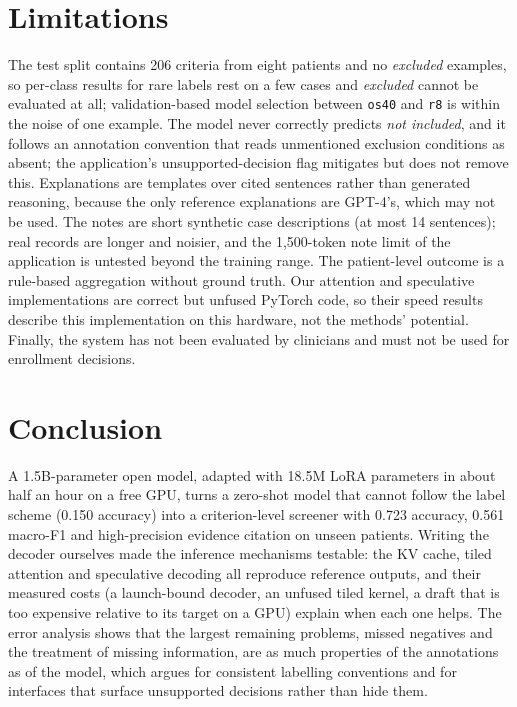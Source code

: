 \documentclass[conference]{IEEEtran}
\begin{document}
\section{Limitations}
The test split contains 206 criteria from eight patients and no \emph{excluded} examples, so per-class results for rare labels rest on a few cases and \emph{excluded} cannot be evaluated at all; validation-based model selection between \texttt{os40} and \texttt{r8} is within the noise of one example. The model never correctly predicts \emph{not included}, and it follows an annotation convention that reads unmentioned exclusion conditions as absent; the application's unsupported-decision flag mitigates but does not remove this. Explanations are templates over cited sentences rather than generated reasoning, because the only reference explanations are GPT-4's, which may not be used. The notes are short synthetic case descriptions (at most 14 sentences); real records are longer and noisier, and the 1{,}500-token note limit of the application is untested beyond the training range. The patient-level outcome is a rule-based aggregation without ground truth. Our attention and speculative implementations are correct but unfused PyTorch code, so their speed results describe this implementation on this hardware, not the methods' potential. Finally, the system has not been evaluated by clinicians and must not be used for enrollment decisions.

\section{Conclusion}
A 1.5B-parameter open model, adapted with 18.5M LoRA parameters in about half an hour on a free GPU, turns a zero-shot model that cannot follow the label scheme (0.150 accuracy) into a criterion-level screener with 0.723 accuracy, 0.561 macro-F1 and high-precision evidence citation on unseen patients. Writing the decoder ourselves made the inference mechanisms testable: the KV cache, tiled attention and speculative decoding all reproduce reference outputs, and their measured costs (a launch-bound decoder, an unfused tiled kernel, a draft that is too expensive relative to its target on a GPU) explain when each one helps. The error analysis shows that the largest remaining problems, missed negatives and the treatment of missing information, are as much properties of the annotations as of the model, which argues for consistent labelling conventions and for interfaces that surface unsupported decisions rather than hide them.
\end{document}
